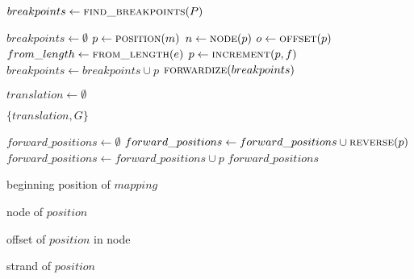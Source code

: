 \documentclass{article}
\begin{document}
\begin{algorithm}
  \begin{algorithmic}
    
    \State {}
    \State $breakpoints \gets \Call{find\_breakpoints}{P}$
    \EndFunction


    \State {}
    \State $breakpoints \gets \emptyset$
    \State $p \gets \Call{position}{m}$
    \State $n \gets \Call{node}{p}$
    \State $o \gets \Call{offset}{p}$
    \State $from\_length \gets \Call{from\_length}{e}$
    \State $p \gets \Call{increment}{p, f}$
    \State $breakpoints \gets breakpoints \cup p$
    \EndIf
    \EndFor
    \EndFor
    \EndFor
    \Return $\Call{forwardize}{breakpoints}$
    \EndFunction

    \State $translation \gets \emptyset$
    
    \Return $\{ translation, G \}$
    \EndFunction

    \State {}
    \State $forward\_positions \gets \emptyset$
    \State $forward\_positions \gets forward\_positions \cup \Call{reverse}{p}$
    \Else
    \State $forward\_positions \gets forward\_positions \cup p$
    \EndIf
    \EndFor
    \Return $forward\_positions$
    \EndFunction

    \Return beginning position of $mapping$
    \EndFunction

    \Return node of $position$
    \EndFunction

    \Return offset of $position$ in node
    \EndFunction

    \Return strand of $position$
    \EndFunction


\end{algorithmic}
\end{algorithm}
\end{document}
